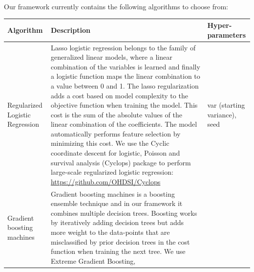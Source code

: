\documentclass[]{book}
\begin{document}
Our framework currently contains the following algorithms to choose
from:

\begin{longtable}[]{@{}lll@{}}
\toprule
\begin{minipage}[b]{0.12\columnwidth}\raggedright\strut
Algorithm\strut
\end{minipage} & \begin{minipage}[b]{0.55\columnwidth}\raggedright\strut
Description\strut
\end{minipage} & \begin{minipage}[b]{0.25\columnwidth}\raggedright\strut
Hyper-parameters\strut
\end{minipage}\tabularnewline
\midrule
\endhead
\begin{minipage}[t]{0.12\columnwidth}\raggedright\strut
Regularized Logistic Regression\strut
\end{minipage} & \begin{minipage}[t]{0.55\columnwidth}\raggedright\strut
Lasso logistic regression belongs to the family of generalized linear
models, where a linear combination of the variables is learned and
finally a logistic function maps the linear combination to a value
between 0 and 1. The lasso regularization adds a cost based on model
complexity to the objective function when training the model. This cost
is the sum of the absolute values of the linear combination of the
coefficients. The model automatically performs feature selection by
minimizing this cost. We use the Cyclic coordinate descent for logistic,
Poisson and survival analysis (Cyclops) package to perform large-scale
regularized logistic regression:
\url{https://github.com/OHDSI/Cyclops}\strut
\end{minipage} & \begin{minipage}[t]{0.25\columnwidth}\raggedright\strut
var (starting variance), seed\strut
\end{minipage}\tabularnewline
\begin{minipage}[t]{0.12\columnwidth}\raggedright\strut
Gradient boosting machines\strut
\end{minipage} & \begin{minipage}[t]{0.55\columnwidth}\raggedright\strut
Gradient boosting machines is a boosting ensemble technique and in our
framework it combines multiple decision trees. Boosting works by
iteratively adding decision trees but adds more weight to the
data-points that are misclassified by prior decision trees in the cost
function when training the next tree. We use Extreme Gradient Boosting,

\end{minipage}
\end{longtable}
\end{document}
